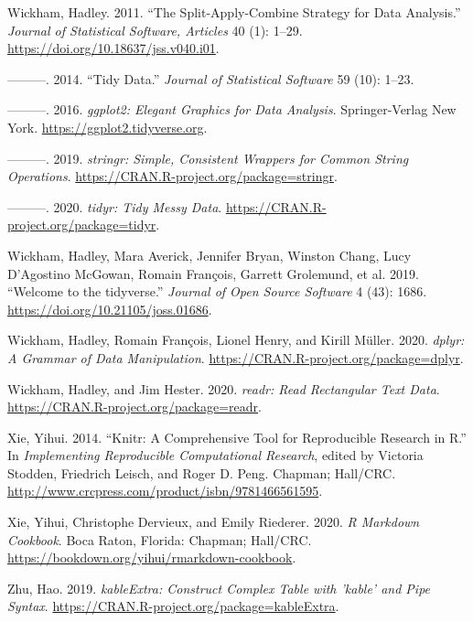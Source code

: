 \documentclass{article}
\newlength{\cslhangindent}
\newlength{\cslentryspacingunit} %
\newenvironment{CSLReferences}[2] %
 {%
  \setlength{\parindent}{0pt}
  \ifodd #1
  \let\oldpar\par
  \def\par{\hangindent=\cslhangindent\oldpar}
  \fi
  \setlength{\parskip}{#2\cslentryspacingunit}
 }%
 {}
\begin{document}
\begin{CSLReferences}{1}{0}
\leavevmode{}%
Wickham, Hadley. 2011. {``The Split-Apply-Combine Strategy for Data Analysis.''} \emph{Journal of Statistical Software, Articles} 40 (1): 1--29. \url{https://doi.org/10.18637/jss.v040.i01}.

\leavevmode{}%
---------. 2014. {``Tidy Data.''} \emph{Journal of Statistical Software} 59 (10): 1--23.

\leavevmode{}%
---------. 2016. \emph{{ggplot2: Elegant Graphics for Data Analysis}}. Springer-Verlag New York. \url{https://ggplot2.tidyverse.org}.

\leavevmode{}%
---------. 2019. \emph{{stringr: Simple, Consistent Wrappers for Common String Operations}}. \url{https://CRAN.R-project.org/package=stringr}.

\leavevmode{}%
---------. 2020. \emph{{tidyr: Tidy Messy Data}}. \url{https://CRAN.R-project.org/package=tidyr}.

\leavevmode{}%
Wickham, Hadley, Mara Averick, Jennifer Bryan, Winston Chang, Lucy D'Agostino McGowan, Romain François, Garrett Grolemund, et al. 2019. {``Welcome to the {tidyverse}.''} \emph{Journal of Open Source Software} 4 (43): 1686. \url{https://doi.org/10.21105/joss.01686}.

\leavevmode{}%
Wickham, Hadley, Romain François, Lionel Henry, and Kirill Müller. 2020. \emph{{dplyr: A Grammar of Data Manipulation}}. \url{https://CRAN.R-project.org/package=dplyr}.

\leavevmode{}%
Wickham, Hadley, and Jim Hester. 2020. \emph{{readr: Read Rectangular Text Data}}. \url{https://CRAN.R-project.org/package=readr}.

\leavevmode{}%
Xie, Yihui. 2014. {``Knitr: A Comprehensive Tool for Reproducible Research in {R}.''} In \emph{Implementing Reproducible Computational Research}, edited by Victoria Stodden, Friedrich Leisch, and Roger D. Peng. Chapman; Hall/CRC. \url{http://www.crcpress.com/product/isbn/9781466561595}.

\leavevmode{}%
Xie, Yihui, Christophe Dervieux, and Emily Riederer. 2020. \emph{R Markdown Cookbook}. Boca Raton, Florida: Chapman; Hall/CRC. \url{https://bookdown.org/yihui/rmarkdown-cookbook}.

\leavevmode{}%
Zhu, Hao. 2019. \emph{{kableExtra: Construct Complex Table with 'kable' and Pipe Syntax}}. \url{https://CRAN.R-project.org/package=kableExtra}.

\end{CSLReferences}



\end{document}
